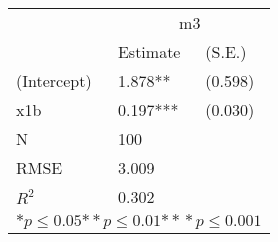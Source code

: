 \begin{tabular}{*{3}{l}}
\hline
                  & \multicolumn{2}{c}{m3}   \tabularnewline
                   &Estimate  &(S.E.)  \tabularnewline
 \hline
 \hline
   (Intercept)     &1.878**   &   (0.598) \tabularnewline
   x1b             &0.197***   &   (0.030) \tabularnewline
 \hline
 N                 &100       &        \tabularnewline
 RMSE             &3.009         & \tabularnewline
 $R^2$             &0.302         & \tabularnewline
 \hline
\hline
 
 \multicolumn{3}{c}{${*  p}\le 0.05$${*\!\!*  p}\le 0.01$${*\!\!*\!\!*  p}\le 0.001$}\tabularnewline
 \end{tabular}